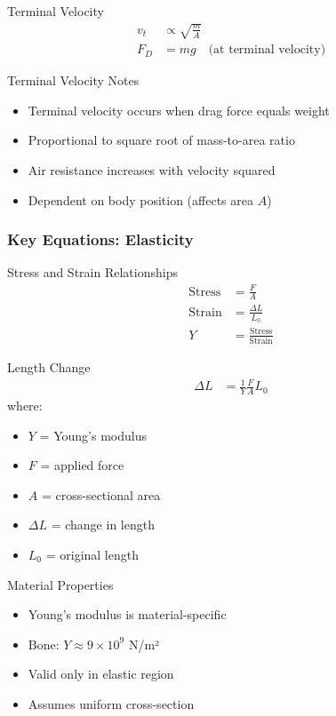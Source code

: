 \documentclass{beamer}
\begin{document}
\begin{frame}
\begin{block}{Terminal Velocity}
\begin{align*}
v_t &\propto \sqrt{\frac{m}{A}} \\
F_D &= mg \quad \text{(at terminal velocity)}
\end{align*}
\end{block}

\begin{alertblock}{Terminal Velocity Notes}
\begin{itemize}
\item Terminal velocity occurs when drag force equals weight
\item Proportional to square root of mass-to-area ratio
\item Air resistance increases with velocity squared
\item Dependent on body position (affects area $A$)
\end{itemize}
\end{alertblock}
\end{frame}

\begin{frame}
\frametitle{Key Equations: Elasticity}
\begin{block}{Stress and Strain Relationships}
\begin{align*}
\text{Stress} &= \frac{F}{A} \\
\text{Strain} &= \frac{\Delta L}{L_0} \\
Y &= \frac{\text{Stress}}{\text{Strain}}
\end{align*}
\end{block}
\end{frame}

\begin{frame}
\begin{block}{Length Change}
\begin{align*}
\Delta L &= \frac{1}{Y}\frac{F}{A}L_0
\end{align*}
where:
\begin{itemize}
\item $Y$ = Young's modulus
\item $F$ = applied force
\item $A$ = cross-sectional area
\item $\Delta L$ = change in length
\item $L_0$ = original length
\end{itemize}
\end{block}

\begin{alertblock}{Material Properties}
\begin{itemize}
\item Young's modulus is material-specific
\item Bone: $Y \approx 9 \times 10^9$ N/m²
\item Valid only in elastic region
\item Assumes uniform cross-section
\end{itemize}
\end{alertblock}
\end{frame}
\end{document}
